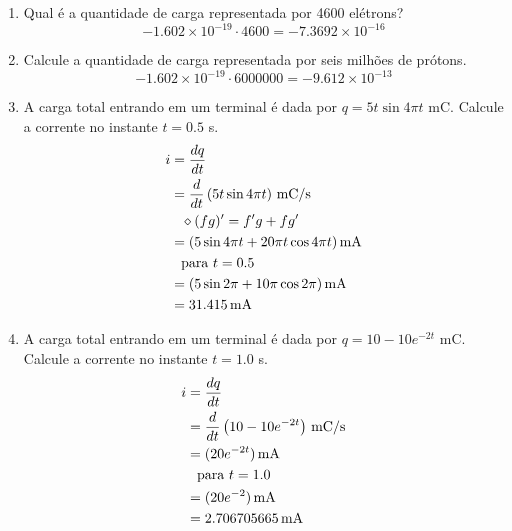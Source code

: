 \begin{enumerate}
	\item Qual é a quantidade de carga representada por 4600 elétrons?
	      \[
		      -1.602 \times 10^{-19} \cdot 4600 = −7.3692 \times 10^{-16}
	      \]

	\item Calcule a quantidade de carga representada por seis milhões de prótons.
	      \[
		      -1.602 \times 10^{-19} \cdot 6000000 = −9.612 \times 10^{-13}
	      \]

	\item A carga total entrando em um terminal é dada por \( q = 5t \sin{4\pi t}
	      \) mC. Calcule a corrente no instante \( t = 0.5 \) s.
	      \[
		      \begin{aligned}
			      i & = \frac{dq}{dt}                                           \\
			        & = \frac{d}{dt}\left(5t \sin{4\pi t}\right) \, \text{mC/s} \\
			        & \hphantom{=} \diamond (fg)' =  f'g + fg'                  \\
			        & = (5 \sin{4\pi t} + 20\pi t \cos{4\pi t}) \, \text{mA}    \\
			        & \hphantom{=} \text{para } t = 0.5                         \\
			        & = (5 \sin{2\pi} + 10\pi \cos{2\pi}) \, \text{mA}          \\
			        & = 31.415 \, \text{mA}                                     \\
		      \end{aligned}
	      \]
	\item A carga total entrando em um terminal é dada por \( q = 10 -
	      10e^{-2t} \) mC. Calcule a corrente no instante \( t = 1.0 \) s.
	      \[
		      \begin{aligned}
			      i & = \frac{dq}{dt}                                          \\
			        & = \frac{d}{dt}\left(10 - 10e^{-2t}\right) \, \text{mC/s} \\
			        & = (20e^{-2t}) \, \text{mA}                               \\
			        & \hphantom{=} \text{para } t = 1.0                        \\
			        & = (20e^{-2}) \, \text{mA}                                \\
			        & = 2.706705665 \, \text{mA}                               \\

\end{aligned}\]
\end{enumerate}
